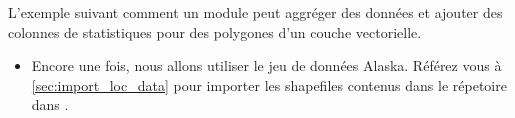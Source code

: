 {%
L'exemple suivant comment un module \grass peut aggréger des données et ajouter des colonnes de statistiques pour des polygones d'un couche vectorielle.

\begin{itemize}[label=--]
\item Encore une fois, nous allons utiliser le jeu de  données Alaska. Référez vous à \ref{sec:import_loc_data} pour importer les shapefiles contenus dans le répetoire  dans \grass.

\end{itemize}}
